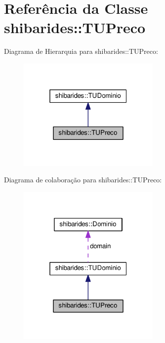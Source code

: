 \hypertarget{classshibarides_1_1TUPreco}{}\section{Referência da Classe shibarides\+:\+:T\+U\+Preco}
\label{classshibarides_1_1TUPreco}


Diagrama de Hierarquia para shibarides\+:\+:T\+U\+Preco\+:\nopagebreak
\begin{figure}[H]
\begin{center}
\leavevmode
\includegraphics[width=196pt]{classshibarides_1_1TUPreco__inherit__graph}
\end{center}
\end{figure}


Diagrama de colaboração para shibarides\+:\+:T\+U\+Preco\+:\nopagebreak
\begin{figure}[H]
\begin{center}
\leavevmode
\includegraphics[width=196pt]{classshibarides_1_1TUPreco__coll__graph}
\end{center}
\end{figure}
